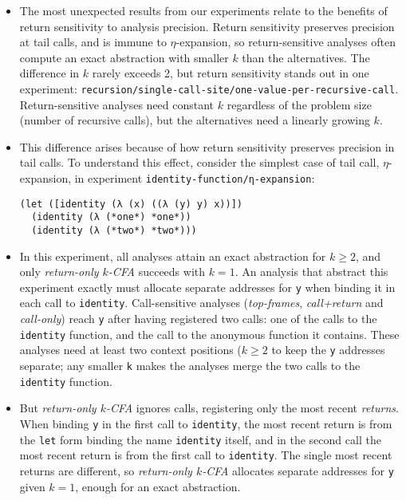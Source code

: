 \documentclass[12pt, oneside]{book}
\begin{document}
\begin{itemize}
  \item The most unexpected results from our experiments relate to the benefits of return sensitivity to analysis precision. Return sensitivity preserves precision at tail calls, and is immune to \(η\)-expansion, so return-sensitive analyses often compute an exact abstraction with smaller \(k\) than the alternatives. The difference in \(k\) rarely exceeds 2, but return sensitivity stands out in one experiment: \texttt{recursion/single-call-site/one-value-per-recursive-call}. Return-sensitive analyses need constant \(k\) regardless of the problem size (number of recursive calls), but the alternatives need a linearly growing \(k\).
  \item This difference arises because of how return sensitivity preserves precision in tail calls. To understand this effect, consider the simplest case of tail call, \(η\)-expansion, in experiment \texttt{identity-function/η-expansion}:

  \begin{Verbatim}
(let ([identity (λ (x) ((λ (y) y) x))])
  (identity (λ (*one*) *one*))
  (identity (λ (*two*) *two*)))
  \end{Verbatim}

  \item In this experiment, all analyses attain an exact abstraction for \(k ≥ 2\), and only \emph{return-only \(k\)-CFA} succeeds with \(k = 1\). An analysis that abstract this experiment exactly must allocate separate addresses for \texttt{y} when binding it in each call to \texttt{identity}. Call-sensitive analyses (\emph{top-frames}, \emph{call+return} and \emph{call-only}) reach \texttt{y} after having registered two calls: one of the calls to the \texttt{identity} function, and the call to the anonymous function it contains. These analyses need at least two context positions (\(k ≥ 2\) to keep the \texttt{y} addresses separate; any smaller \texttt{k} makes the analyses merge the two calls to the \texttt{identity} function.
  
  \item But \emph{return-only \(k\)-CFA} ignores calls, registering only the most recent \emph{returns}. When binding \texttt{y} in the first call to \texttt{identity}, the most recent return is from the \texttt{let} form binding the name \texttt{identity} itself, and in the second call the most recent return is from the first call to \texttt{identity}. The single most recent returns are different, so \emph{return-only \(k\)-CFA} allocates separate addresses for \texttt{y} given \(k = 1\), enough for an exact abstraction.
  

\end{itemize}
\end{document}
